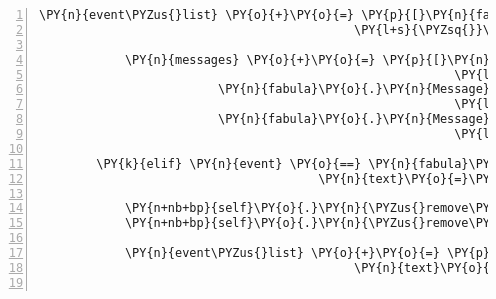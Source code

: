 \begin{Verbatim}[commandchars=\\\{\},numbers=left,firstnumber=1,stepnumber=1]
            \PY{n}{event\PYZus{}list} \PY{o}{+}\PY{o}{=} \PY{p}{[}\PY{n}{fabula}\PY{o}{.}\PY{n}{SaysEvent}\PY{p}{(}\PY{n}{ID\PYZus{}CASSANDRA}\PY{p}{,}
                                            \PY{l+s}{\PYZsq{}}\PY{l+s}{Ich bin Cassandra die Fee und würde gerne durch den Zauberwald reisen!}\PY{l+s}{\PYZsq{}}\PY{p}{)}\PY{p}{]}

            \PY{n}{messages} \PY{o}{+}\PY{o}{=} \PY{p}{[}\PY{n}{fabula}\PY{o}{.}\PY{n}{Message}\PY{p}{(}\PY{p}{[}\PY{n}{fabula}\PY{o}{.}\PY{n}{SaysEvent}\PY{p}{(}\PY{l+s}{\PYZsq{}}\PY{l+s}{guardian}\PY{l+s}{\PYZsq{}}\PY{p}{,}
                                                          \PY{l+s}{\PYZsq{}}\PY{l+s}{Wegezoll auch für Feen! 5 Goldtaler bitte.}\PY{l+s}{\PYZsq{}}\PY{p}{)}\PY{p}{]}\PY{p}{)}\PY{p}{,}
                         \PY{n}{fabula}\PY{o}{.}\PY{n}{Message}\PY{p}{(}\PY{p}{[}\PY{n}{fabula}\PY{o}{.}\PY{n}{SaysEvent}\PY{p}{(}\PY{n}{ID\PYZus{}CASSANDRA}\PY{p}{,}
                                                          \PY{l+s}{\PYZsq{}}\PY{l+s}{Ich habe leider kein Gold.}\PY{l+s}{\PYZsq{}}\PY{p}{)}\PY{p}{]}\PY{p}{)}\PY{p}{,}
                         \PY{n}{fabula}\PY{o}{.}\PY{n}{Message}\PY{p}{(}\PY{p}{[}\PY{n}{fabula}\PY{o}{.}\PY{n}{SaysEvent}\PY{p}{(}\PY{l+s}{\PYZsq{}}\PY{l+s}{guardian}\PY{l+s}{\PYZsq{}}\PY{p}{,}
                                                          \PY{l+s}{\PYZsq{}}\PY{l+s}{Tja, dann darfst du nicht passieren.}\PY{l+s}{\PYZsq{}}\PY{p}{)}\PY{p}{]}\PY{p}{)}\PY{p}{]}

        \PY{k}{elif} \PY{n}{event} \PY{o}{==} \PY{n}{fabula}\PY{o}{.}\PY{n}{SaysEvent}\PY{p}{(}\PY{n}{identifier}\PY{o}{=}\PY{n}{ID\PYZus{}KUNI}\PY{p}{,}
                                       \PY{n}{text}\PY{o}{=}\PY{l+s}{\PYZsq{}}\PY{l+s}{Hallo, ich bin der Gnom Kuni.}\PY{l+s}{\PYZsq{}}\PY{p}{)}\PY{p}{:}

            \PY{n+nb+bp}{self}\PY{o}{.}\PY{n}{\PYZus{}remove\PYZus{}sentence}\PY{p}{(}\PY{n}{ID\PYZus{}KUNI}\PY{p}{,} \PY{n}{event}\PY{o}{.}\PY{n}{text}\PY{p}{)}
            \PY{n+nb+bp}{self}\PY{o}{.}\PY{n}{\PYZus{}remove\PYZus{}sentence}\PY{p}{(}\PY{n}{ID\PYZus{}CASSANDRA}\PY{p}{,} \PY{l+s}{\PYZsq{}}\PY{l+s}{Mit wem habe ich die Ehre?}\PY{l+s}{\PYZsq{}}\PY{p}{)}

            \PY{n}{event\PYZus{}list} \PY{o}{+}\PY{o}{=} \PY{p}{[}\PY{n}{fabula}\PY{o}{.}\PY{n}{SaysEvent}\PY{p}{(}\PY{n}{identifier}\PY{o}{=}\PY{n}{ID\PYZus{}CASSANDRA}\PY{p}{,}
                                            \PY{n}{text}\PY{o}{=}\PY{l+s}{\PYZsq{}}\PY{l+s}{Sehr erfreut!}\PY{l+s}{\PYZsq{}}\PY{p}{)}\PY{p}{]}


\end{Verbatim}
